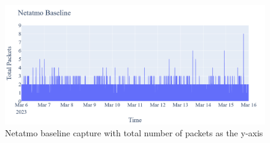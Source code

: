 \begin{figure} [H]    
    \centering
    \includegraphics[scale=0.25]{figures/Netatmo_Baseline_TotalPackets.png}
    \caption{Netatmo baseline capture with total number of packets as the y-axis}
    \label{fig:NetatmoBaselineTotalPackets}
 \end{figure}

